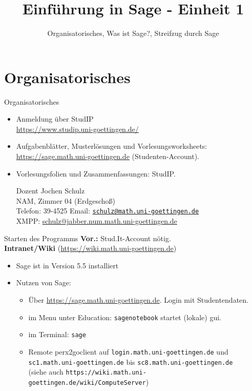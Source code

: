 \documentclass[hyperref={xetex}]{beamer}
\title{Einführung in Sage - Einheit 1}
\subtitle{Organisatorisches, Was ist Sage?, Streifzug durch Sage}
\begin{document}
\titlepage

\section*{Organisatorisches}

\begin{frame}{Organisatorisches}
\begin{itemize}
\item Anmeldung über StudIP \\
      \url{https://www.studip.uni-goettingen.de/}

{\color{blue}{Einführung in Sage (Mathematische Anwendersysteme) (WS 2012/2013)}}
\item Aufgabenblätter, Musterlösungen und Vorlesungsworksheets: \url{https://sage.math.uni-goettingen.de} (Studenten-Account).
\item Vorlesungsfolien und Zusammenfassungen: StudIP. 
\pause
\begin{block}{Dozent}
Jochen Schulz\\
NAM, Zimmer 04 (Erdgescho{\ss})\\
Telefon: 39-4525
Email: \href{mailto:schulz@math.uni-goettingen.de}{\texttt{schulz@math.uni-goettingen.de}}\\
XMPP: \url{schulz@jabber.num.math.uni-goettingen.de}\\

\end{block}
\end{itemize}
\end{frame}

\begin{frame}{Starten des Programms}
\textbf{Vor.:} \alert{Stud.It-Account} nötig. \\
\textbf{Intranet/Wiki} (\url{https://wiki.math.uni-goettingen.de})
\begin{itemize}
\item Sage ist in Version 5.5 installiert
\item Nutzen von Sage: 
\begin{itemize}
\item Über \url{https://sage.math.uni-goettingen.de}. Login mit Studentendaten.
\item im Menu unter Education: \texttt{sagenotebook} startet (lokale) gui.\\
\item im Terminal: \texttt{sage}
\item Remote per\alert{x2goclient}
auf \texttt{login.math.uni-goettingen.de} und \texttt{sc1.math.uni-goettingen.de} bis 
\texttt{sc8.math.uni-goettingen.de} \\
(siehe auch \texttt{https://wiki.math.uni-goettingen.de/wiki/ComputeServer})
\end{itemize}
\end{itemize}
\end{frame}
\end{document}
